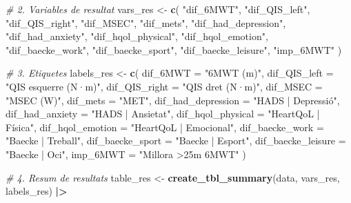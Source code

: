 \documentclass[CAT]{TFUOC}%
\newenvironment{Shaded}{\begin{snugshade}}{\end{snugshade}}
\newcommand{\AttributeTok}[1]{\textcolor[rgb]{0.13,0.29,0.53}{#1}}
\newcommand{\CommentTok}[1]{\textcolor[rgb]{0.56,0.35,0.01}{\textit{#1}}}
\newcommand{\FunctionTok}[1]{\textcolor[rgb]{0.13,0.29,0.53}{\textbf{#1}}}
\newcommand{\NormalTok}[1]{#1}
\newcommand{\OtherTok}[1]{\textcolor[rgb]{0.56,0.35,0.01}{#1}}
\newcommand{\SpecialCharTok}[1]{\textcolor[rgb]{0.81,0.36,0.00}{\textbf{#1}}}
\newcommand{\StringTok}[1]{\textcolor[rgb]{0.31,0.60,0.02}{#1}}
\begin{document}
\begin{Shaded}
\begin{Highlighting}[]
\CommentTok{\# 2. Variables de resultat}
\NormalTok{vars\_res }\OtherTok{\textless{}{-}} \FunctionTok{c}\NormalTok{(}
  \StringTok{"dif\_6MWT"}\NormalTok{, }\StringTok{"dif\_QIS\_left"}\NormalTok{, }\StringTok{"dif\_QIS\_right"}\NormalTok{, }\StringTok{"dif\_MSEC"}\NormalTok{, }\StringTok{"dif\_mets"}\NormalTok{, }
  \StringTok{"dif\_had\_depression"}\NormalTok{, }\StringTok{"dif\_had\_anxiety"}\NormalTok{, }\StringTok{"dif\_hqol\_physical"}\NormalTok{, }
  \StringTok{"dif\_hqol\_emotion"}\NormalTok{, }\StringTok{"dif\_baecke\_work"}\NormalTok{, }\StringTok{"dif\_baecke\_sport"}\NormalTok{, }
  \StringTok{"dif\_baecke\_leisure"}\NormalTok{, }\StringTok{"imp\_6MWT"}
\NormalTok{)}

\CommentTok{\# 3. Etiquetes}
\NormalTok{labels\_res }\OtherTok{\textless{}{-}} \FunctionTok{c}\NormalTok{(}
  \AttributeTok{dif\_6MWT =} \StringTok{"6MWT (m)"}\NormalTok{, }
  \AttributeTok{dif\_QIS\_left =} \StringTok{"QIS esquerre (N·m)"}\NormalTok{, }
  \AttributeTok{dif\_QIS\_right =} \StringTok{"QIS dret (N·m)"}\NormalTok{, }
  \AttributeTok{dif\_MSEC =} \StringTok{"MSEC (W)"}\NormalTok{, }
  \AttributeTok{dif\_mets =} \StringTok{"MET"}\NormalTok{, }
  \AttributeTok{dif\_had\_depression =} \StringTok{"HADS | Depressió"}\NormalTok{, }
  \AttributeTok{dif\_had\_anxiety =} \StringTok{"HADS | Ansietat"}\NormalTok{, }
  \AttributeTok{dif\_hqol\_physical =} \StringTok{"HeartQoL | Física"}\NormalTok{, }
  \AttributeTok{dif\_hqol\_emotion =} \StringTok{"HeartQoL | Emocional"}\NormalTok{, }
  \AttributeTok{dif\_baecke\_work =} \StringTok{"Baecke | Treball"}\NormalTok{, }
  \AttributeTok{dif\_baecke\_sport =} \StringTok{"Baecke | Esport"}\NormalTok{, }
  \AttributeTok{dif\_baecke\_leisure =} \StringTok{"Baecke | Oci"}\NormalTok{, }
  \AttributeTok{imp\_6MWT =} \StringTok{"Millora \textgreater{}25m 6MWT"}
\NormalTok{)}

\CommentTok{\# 4. Resum de resultats}
\NormalTok{table\_res }\OtherTok{\textless{}{-}} \FunctionTok{create\_tbl\_summary}\NormalTok{(data, vars\_res, labels\_res) }\SpecialCharTok{|\textgreater{}} 
  

\end{Highlighting}
\end{Shaded}
\end{document}
